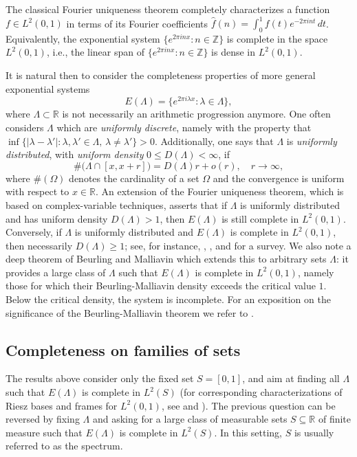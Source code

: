 \documentclass[reqno,a4paper,12pt]{amsart}
\numberwithin{equation}{section}
\def\Z{{\mathbb Z}}
\def\R{{\mathbb R}}
\newcommand\1{\mathds{1}}
\begin{document}
The classical Fourier uniqueness theorem completely characterizes a function $f \in L^2(0,1)$ in terms of its Fourier coefficients $\hat f(n)=\int_0^1 f(t) e^{-2\pi i n t} \, dt$. Equivalently, the exponential system $\{ e^{2\pi i n x} : n \in \Z \}$ is complete in the space $L^2(0,1)$, i.e., the linear span of $\{ e^{2\pi i n x} : n \in \Z \}$ is dense in $L^2(0,1)$.

It is natural then to consider the completeness properties of more general exponential systems
$$
E(\Lambda) = \{ e^{2\pi i \lambda x} : \lambda \in \Lambda \},
$$
where $\Lambda\subset \R$ is not necessarily an arithmetic progression anymore. One often considers $\Lambda$ which are \textit{uniformly discrete}, namely with the property that $\inf \{ |\lambda - \lambda'| : \lambda, \lambda' \in \Lambda, \, \lambda \neq \lambda' \} > 0$. Additionally, one says that $\Lambda$ is \textit{uniformly distributed}, with \textit{uniform density} $0 \leq D(\Lambda) < \infty$, if
$$
\#\big ( \Lambda \cap [x,x+r] \big) = D(\Lambda)r + o(r), \quad r \to \infty,
$$
where $\#(\Omega)$ denotes the cardinality of a set $\Omega$ and the convergence is uniform with respect to $x \in \R$. An extension of the Fourier uniqueness theorem, which is based on complex-variable techniques, asserts that if $\Lambda$ is uniformly distributed and has uniform density $D(\Lambda) > 1$, then $E(\Lambda)$ is still complete in $L^2(0,1)$. Conversely, if $\Lambda$ is uniformly distributed and $E(\Lambda)$ is complete in $L^2(0,1)$, then necessarily $D(\Lambda) \geq 1$; see, for instance, \cite[Lectures 16-18]{Levin1996}, \cite{Young2001}, and \cite{Redheffer1977} for a survey. We also note a deep theorem of Beurling and Malliavin \cite{BeurlingMalliavin1967} which extends this to arbitrary sets $\Lambda$: it provides a large class of $\Lambda$ such that $E(\Lambda)$ is complete in $L^2(0,1)$, namely those for which their Beurling-Malliavin density exceeds the critical value $1$. Below the critical density, the system is incomplete. For an exposition on the significance of the Beurling-Malliavin theorem we refer to \cite{mashreghi2006beurling}.

\subsection{Completeness on families of sets}
The results above consider only the fixed set $S=[0,1]$, and aim at finding all $\Lambda$ such that $E(\Lambda)$ is complete in $L^2(S)$ (for corresponding characterizations of Riesz bases and frames for $L^2(0,1)$, see \cite{pavlov1979basicity,lyubarskii1997complete} and \cite{ortega2002fourier}). The previous question can be reversed by fixing $\Lambda$ and asking for a large class of measurable sets $S \subseteq \R$ of finite measure such that $E(\Lambda)$ is complete in $L^2(S)$.  In this setting, $S$ is usually referred to as the spectrum. 
\end{document}
